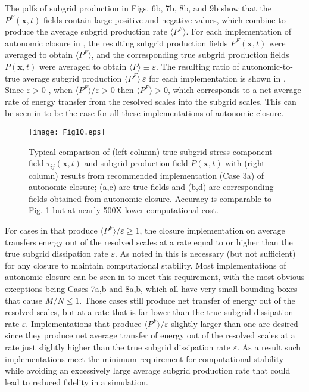 The pdfs of subgrid production in Figs. 6b, 7b, 8b, and 9b show that the $P^F(\mathbf{x},t)$  fields contain large positive and negative values, which combine to produce the average subgrid production rate $\langle P^F \rangle$. For each implementation of autonomic closure in , the resulting  subgrid production fields $P^F(\mathbf{x},t)$  were averaged to obtain $\langle P^F \rangle$, and the corresponding true subgrid production fields $P(\mathbf{x},t)$   were averaged to obtain $\langle P \rangle \equiv \varepsilon$. The resulting ratio of autonomic-to-true average subgrid production $\langle P^F \rangle\ \varepsilon$  for each implementation is shown in . Since $\varepsilon > 0$ , when  $\langle P^F\rangle/ \varepsilon > 0$  then $\langle P^F \rangle > 0$, which corresponds to a net average rate of energy transfer from the resolved scales into the subgrid scales.  This can be seen in  to be the case for all these implementations of autonomic closure. 

%
\begin{figure}
	\begin{center}
	\texttt{[image: Fig10.eps]}
	\caption{Typical comparison of (left column) true subgrid stress component field $\tau_{ij}(\mathbf{x},t)$ and subgrid production field $P(\mathbf{x},t)$ with (right column) results from recommended implementation (Case 3a) of autonomic closure; (a,c) are true fields and (b,d) are corresponding fields obtained from autonomic closure. Accuracy is comparable to Fig. 1 but at nearly 500X lower computational cost.}
	\label{F:10}
	\end{center}
\end{figure}
%
%

For cases in  that produce $\langle P^F \rangle/\varepsilon \geq 1$, the closure implementation on average transfers energy out of the resolved scales at a rate equal to or higher than the true subgrid dissipation rate $\varepsilon$. As noted in  this is necessary (but not sufficient) for any closure to maintain computational stability.  Most implementations of autonomic closure can be seen in  to meet this requirement, with the most obvious exceptions being Cases 7a,b and 8a,b, which all have very small bounding boxes that cause $M/N \leq 1$. Those cases still produce net transfer of energy out of the resolved scales, but at a rate that is far lower than the true subgrid dissipation rate $\varepsilon$. Implementations that produce  $\langle P^F \rangle/\varepsilon$  slightly larger than one are desired since they produce net average transfer of energy out of the resolved scales at a rate just slightly higher than the true subgrid dissipation rate $\varepsilon$. As a result such implementations meet the minimum requirement for computational stability while avoiding an excessively large average subgrid production rate that could lead to reduced fidelity in a simulation. 



